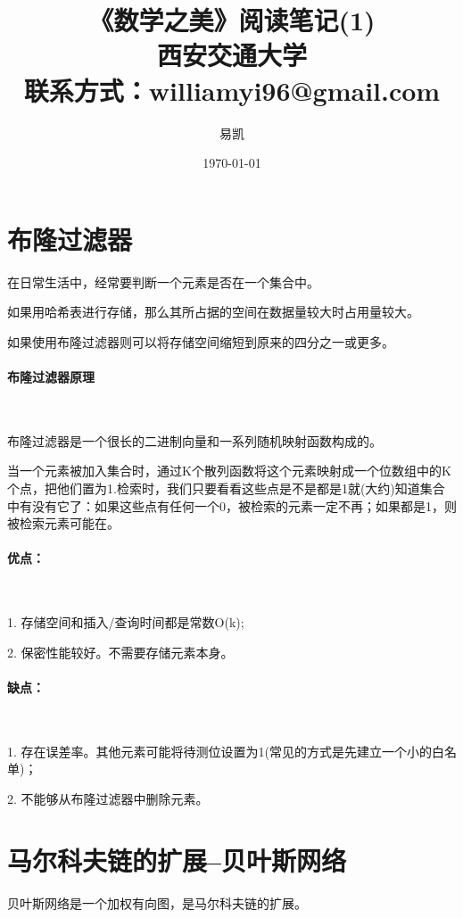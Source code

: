 \documentclass[UTF8]{ctexart}
\title{\huge{《数学之美》阅读笔记(1)\\} \huge{西安交通大学 \\ 联系方式：williamyi96@gmail.com\\ }}
\author{\huge{易凯}}
\date{\Huge\today}
\begin{document}
	\maketitle
	\vspace{100mm}
	\newpage
	\tableofcontents
	\newpage

	\section{布隆过滤器}
	在日常生活中，经常要判断一个元素是否在一个集合中。

	如果用哈希表进行存储，那么其所占据的空间在数据量较大时占用量较大。

	如果使用布隆过滤器则可以将存储空间缩短到原来的四分之一或更多。

	\paragraph{布隆过滤器原理}

	~

	布隆过滤器是一个很长的二进制向量和一系列随机映射函数构成的。

	当一个元素被加入集合时，通过K个散列函数将这个元素映射成一个位数组中的K个点，把他们置为1.检索时，我们只要看看这些点是不是都是1就(大约)知道集合中有没有它了：如果这些点有任何一个0，被检索的元素一定不再；如果都是1，则被检索元素可能在。

	\paragraph{优点：}

	~

	1. 存储空间和插入/查询时间都是常数O(k);

	2. 保密性能较好。不需要存储元素本身。

	\paragraph{缺点：}

	~

	1. 存在误差率。其他元素可能将待测位设置为1(常见的方式是先建立一个小的白名单)；

	2. 不能够从布隆过滤器中删除元素。

	\section{马尔科夫链的扩展--贝叶斯网络}
	贝叶斯网络是一个加权有向图，是马尔科夫链的扩展。
\end{document}
